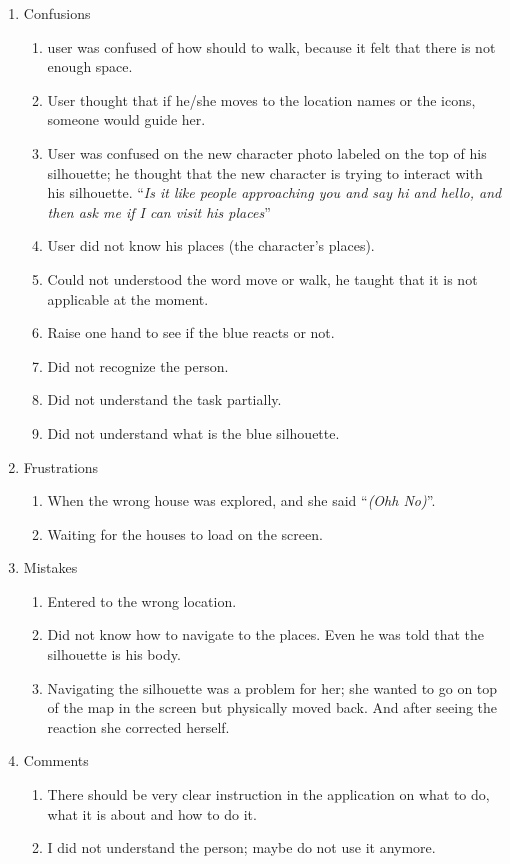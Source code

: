 \begin{enumerate}
\item Confusions 

\begin{enumerate}
\item  user was confused of how should to walk, because it felt that there is not enough space. 
\item  User thought that if he/she moves to the location names or the icons, someone would guide her.
\item  User was confused on the new character photo labeled on the top of his silhouette; he thought that the new character is trying to interact with his silhouette. ``\emph{Is it like people approaching you and say hi and hello, and then ask me if I can visit his places}''
\item  User did not know his places (the character’s places).
\item  Could not understood the word move or walk, he taught that it is not applicable at the moment.
\item  Raise one hand to see if the blue reacts or not.
\item  Did not recognize the person.
\item  Did not understand the task partially.
\item  Did not understand what is the blue silhouette.

\end{enumerate}

\item Frustrations
\begin{enumerate}
\item  When the wrong house was explored, and she said ``\emph{(Ohh No)}''.
\item  Waiting for the houses to load on the screen.
\end{enumerate}

\item Mistakes
\begin{enumerate}
\item  Entered to the wrong location.
\item  Did not know how to navigate to the places. Even he was told that the silhouette is his body.
\item  Navigating the silhouette was a problem for her; she wanted to go on top of the map in the screen but physically moved back. And after seeing the reaction she corrected herself.
\end{enumerate}

\item Comments
\begin{enumerate}

\item   There should be very clear instruction in the application on what to do, what it is about and how to do it.
\item   I did not understand the person; maybe do not use it anymore.


\end{enumerate}
\end{enumerate}


